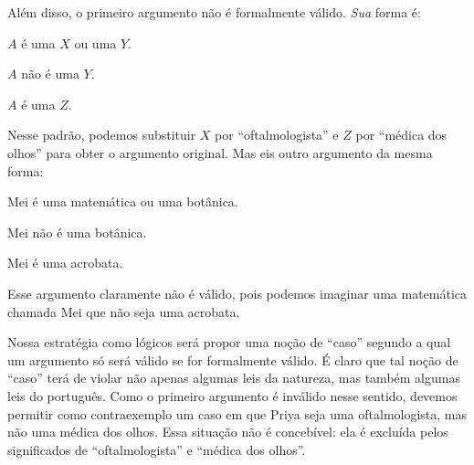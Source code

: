 Além disso, o primeiro argumento não é formalmente válido. \emph{Sua} forma é:
\begin{earg}
	\item[] $A$ é uma $X$ ou uma $Y$.
	\item[] $A$ não é uma $Y$.
	\item[\texttherefore] $A$ é uma $Z$.
\end{earg}
Nesse padrão, podemos substituir $X$ por \textquotedblleft oftalmologista\textquotedblright{} e $Z$ por \textquotedblleft médica dos olhos\textquotedblright{} para obter o argumento original. Mas eis outro argumento da mesma forma:
\begin{earg}
	\item[] Mei é uma matemática ou uma botânica.
	\item[] Mei não é uma botânica.
	\item[\texttherefore] Mei é uma acrobata.
\end{earg}
Esse argumento claramente não é válido, pois podemos imaginar uma matemática chamada Mei que não seja uma acrobata.

Nossa estratégia como lógicos será propor uma noção de \textquotedblleft caso\textquotedblright{} segundo a qual um argumento só será válido se for formalmente válido. É claro que tal noção de \textquotedblleft caso\textquotedblright{} terá de violar não apenas algumas leis da natureza, mas também algumas leis do português. Como o primeiro argumento é inválido nesse sentido, devemos permitir como contraexemplo um caso em que Priya seja uma oftalmologista, mas não uma médica dos olhos. Essa situação não é concebível: ela é excluída pelos significados de \textquotedblleft oftalmologista\textquotedblright{} e \textquotedblleft médica dos olhos\textquotedblright{}.

